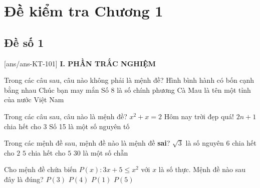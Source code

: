 \section*{Đề kiểm tra Chương 1}
\subsection*{Đề số 1}
\setcounter{ex}{0}\setcounter{bt}{0}
[ans/ans-KT-101]
\noindent\textbf{I. PHẦN TRẮC NGHIỆM}
\begin{ex}%
	Trong các câu sau, câu nào không phải là mệnh đề?
	\choice
	{Hình bình hành có bốn cạnh bằng nhau}
	{\True Chúc bạn may mắn}
	{Số $8$ là số chính phương}
	{Cà Mau là tên một tỉnh của nước Việt Nam}
\end{ex}
\begin{ex}%
	Trong các câu sau, câu nào là mệnh đề?
	\choice
	{$x^2+x=2$}
	{Hôm nay trời đẹp quá!}
	{$2n+1$ chia hết cho 3}
	{\True Số 15 là một số nguyên tố}
\end{ex}
\begin{ex}%
	Trong các mệnh đề sau, mệnh đề nào là mệnh đề \textbf{sai}?
	\choice
	{\True $\sqrt{3}$ là số nguyên}
	{$6$ chia hết cho $2$}
	{$5$ chia hết cho $5$}
	{$30$ là một số chẵn}
\end{ex}
\begin{ex}%
	Cho mệnh đề chứa biến $P(x): 3x+5\le x^2$ với $x$ là số thực. Mệnh đề nào sau đây là đúng?
	\choice
	{$P(3)$}
	{$P(4)$}
	{$P(1)$}
	{\True $P(5)$}
\end{ex}
